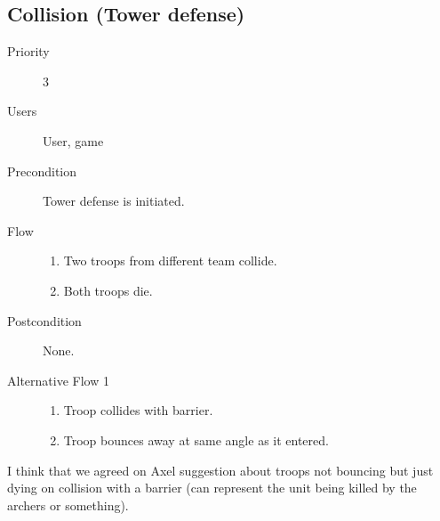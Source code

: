 \documentclass[12pt,a4paper]{article}
\begin{document}
\subsection{Collision (Tower defense)}
\begin{description}
\item[Priority] 3
\item[Users] User, game
\item[Precondition] Tower defense is initiated.
\item[Flow]\mbox{}
  \begin{enumerate}
  \item Two troops from different team collide.
  \item Both troops die.
  \end{enumerate}
\item[Postcondition] None.
\item[Alternative Flow 1]\mbox{}
  \begin{enumerate}
  \item Troop collides with barrier.
  \item Troop bounces away at same angle as it entered.
  \end{enumerate}
\end{description}

\begin{todo}
  I think that we agreed on Axel suggestion about troops not bouncing
  but just dying on collision with a barrier (can represent the unit
  being killed by the archers or something).
\end{todo}
\end{document}
